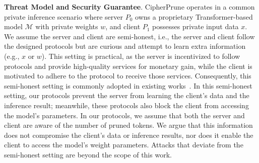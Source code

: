 \noindent\textbf{Threat Model and Security Guarantee}. CipherPrune operates in a common private inference scenario where server $P_0$ owns a proprietary Transformer-based model $\mathcal{M}$ with private weights $w$, and client $P_1$ possesses private input data $x$. We assume the server and client are semi-honest, i.e., the server and client follow the designed protocols but are curious and attempt to learn extra information (e.g., $x$ or $w$). This setting is practical, as the server is incentivized to follow protocols and provide high-quality services for monetary gain, while the client is motivated to adhere to the protocol to receive those services. Consequently, this semi-honest setting is commonly adopted in existing works~\citep{rathee2020cryptflow2, huang2022cheetah, hao2022iron-iron, lu2023bumblebee, pang2023bolt}. In this semi-honest setting, our protocols prevent the server from learning the client's data and the inference result; meanwhile, these protocols also block the client from accessing the model's parameters. In our protocols, we assume that both the server and client are aware of the number of pruned tokens. We argue that this information does not compromise the client's data or inference results, nor does it enable the client to access the model's weight parameters. Attacks that deviate from the semi-honest setting are beyond the scope of this work.  %






